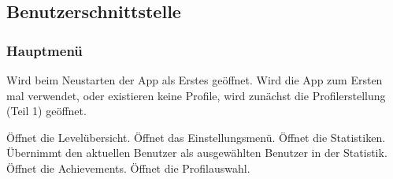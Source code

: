 \subsection{Benutzerschnittstelle}

\begin{center}
\setlength\fboxsep{20pt}
\setlength\fboxrule{1pt}
\end{center}

\subsubsection{Hauptmenü}
Wird beim Neustarten der App als Erstes geöffnet. Wird die App zum Ersten mal verwendet, oder existieren keine Profile, wird zunächst die Profilerstellung (Teil 1) geöffnet.
\begin{requirements}
 Öffnet die Levelübersicht.
 Öffnet das Einstellungsmenü.
 Öffnet die Statistiken. Übernimmt den aktuellen Benutzer als ausgewählten Benutzer in der Statistik.
 Öffnet die Achievements.
 Öffnet die Profilauswahl.
\end{requirements}

\begin{center}
\setlength\fboxsep{20pt}
\setlength\fboxrule{1pt}
\end{center}

